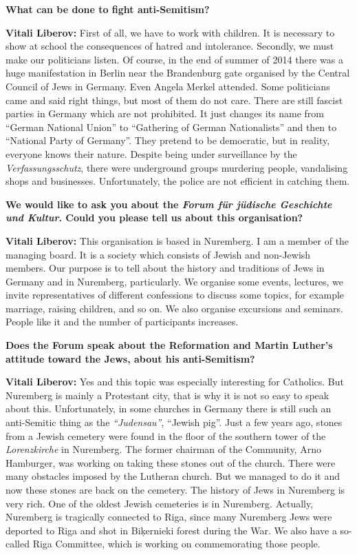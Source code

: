 \textbf{What can be done to fight anti-Semitism?} 

\textbf{Vitali Liberov:} First of all, we have to work with children. It is necessary to show at school the consequences of hatred and intolerance. Secondly, we must make our politicians listen. Of course, in the end of summer of 2014 there was a huge manifestation in Berlin near the Brandenburg gate organised by the Central Council of Jews in Germany. Even Angela Merkel attended. Some politicians came and said right things, but most of them do not care. There are still fascist parties in Germany which are not prohibited. It just changes its name from ``German National Union'' to ``Gathering of German Nationalists'' and then to ``National Party of Germany''. They pretend to be democratic, but in reality, everyone knows their nature. Despite being under surveillance by the \textit{Verfassungsschutz}, there were underground groups murdering people, vandalising shops and businesses. Unfortunately, the police are not efficient in catching them. 

\textbf{We would like to ask you about the \textit{Forum für jüdische Geschichte und Kultur}. Could you please tell us about this organisation?}  

\textbf{Vitali Liberov:} This organisation is based in Nuremberg. I am a member of the managing board. It is a society which consists of Jewish and non-Jewish members. Our purpose is to tell about the history and traditions of Jews in Germany and in Nuremberg, particularly. We organise some events, lectures, we invite representatives of different confessions to discuss some topics, for example marriage, raising children, and so on. We also organise excursions and seminars. People like it and the number of participants increases.  

\textbf{Does the Forum speak about the Reformation and Martin Luther’s attitude toward the Jews, about his anti-Semitism?} 

\textbf{Vitali Liberov:} Yes and this topic was especially interesting for Catholics. But Nuremberg is mainly a Protestant city, that is why it is not so easy to speak about this. Unfortunately, in some churches in Germany there is still such an anti-Semitic thing as the \textit{``Judensau''}, ``Jewish pig''. Just a few years ago, stones from a Jewish cemetery were found in the floor of the southern tower of the \textit{Lorenzkirche} in Nuremberg. The former chairman of the Community, Arno Hamburger, was working on taking these stones out of the church. There were many obstacles imposed by the Lutheran church. But we managed to do it and now these stones are back on the cemetery. The history of Jews in Nuremberg is very rich. One of the oldest Jewish cemeteries is in Nuremberg. Actually, Nuremberg is tragically connected to Riga, since many Nuremberg Jews were deported to Riga and shot in Biķernieki forest during the War. We also have a so-called Riga Committee, which is working on commemorating those people.
